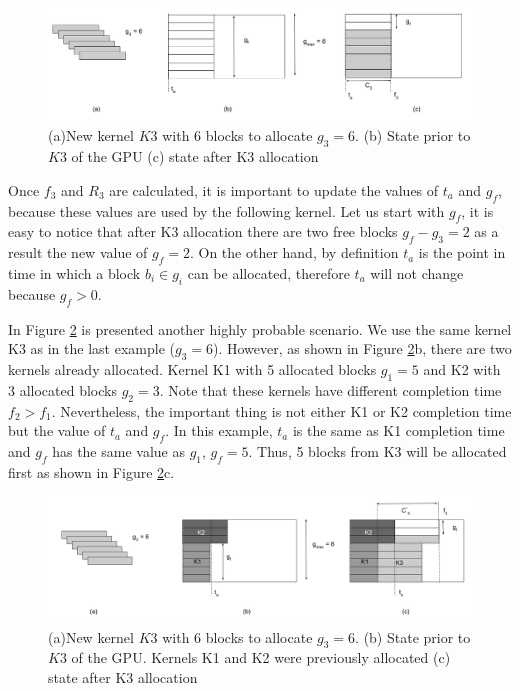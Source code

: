\documentclass[
  12pt,
  a4paperpaper,
]{report}
\begin{document}
\begin{figure}
\centering
\includegraphics{source/figures/new_kernel_1.png}
\caption{(a)New kernel \(K3\) with 6 blocks to allocate \(g_3 = 6\). (b)
State prior to \(K3\) of the GPU (c) state after K3 allocation
\label{img:new_kernel_1}}
\end{figure}

Once \(f_3\) and \(R_3\) are calculated, it is important to update the
values of \(t_a\) and \(g_f\), because these values are used by the
following kernel. Let us start with \(g_f\), it is easy to notice that
after K3 allocation there are two free blocks \(g_f - g_3 = 2\) as a
result the new value of \(g_f = 2\). On the other hand, by definition
\(t_a\) is the point in time in which a block \(b_i \in g_i\) can be
allocated, therefore \(t_a\) will not change because \(g_f > 0\).

In Figure \ref{img:new_kernel_2} is presented another highly probable
scenario. We use the same kernel K3 as in the last example
(\(g_3 = 6\)). However, as shown in Figure \ref{img:new_kernel_2}b,
there are two kernels already  allocated. Kernel K1 with 5
allocated blocks \(g_1 = 5\) and K2 with 3 allocated blocks \(g_2 = 3\).
Note that these kernels have different completion time \(f_2 > f_1\).
Nevertheless, the important thing is not either K1 or K2 completion time but
the value of \(t_a\) and \(g_f\). In this example, \(t_a\) is the same
as K1 completion time and \(g_f\) has the same value as \(g_1\),
\(g_f = 5\). Thus, 5 blocks from K3 will be allocated first as shown in
Figure \ref{img:new_kernel_2}c.~

\begin{figure}
\centering
\includegraphics{source/figures/new_kernel_2.png}
\caption{(a)New kernel \(K3\) with 6 blocks to allocate \(g_3 = 6\). (b)
State prior to \(K3\) of the GPU. Kernels K1 and K2 were previously
allocated (c) state after K3 allocation \label{img:new_kernel_2}}
\end{figure}
\end{document}
